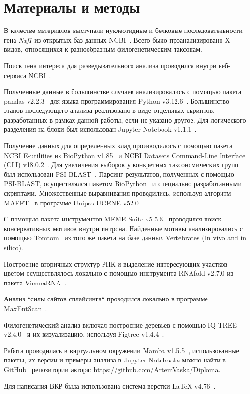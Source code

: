 \newpage
\section{Материалы и методы}

В качестве материалов выступали нуклеотидные и белковые последовательности гена \textit{Nxf1} из открытых баз данных NCBI~\cite{ncbi_general}.
Всего было проанализировано X видов, относящихся к разнообразным филогенетическим таксонам.

Поиск гена интереса для разведывательного анализа проводился внутри веб-сервиса NCBI~\cite{ncbi_general}.

Полученные данные в большинстве случаев анализировались с помощью пакета pandas v2.2.3~\cite{pandas} для языка программирования Python v3.12.6~\cite{python_3_12}.
Большинство этапов последующего анализа реализовано в виде отдельных скриптов, разработанных в рамках данной работы, если не указано другое.
Для логического разделения на блоки был использован Jupyter Notebook v1.1.1~\cite{jupyter_notebook}.

Получение данных для определенных клад производилось с помощью пакета NCBI E-utilities из BioPython v1.85~\cite{biopython} и NCBI Datasets Command-Line Interface (CLI) v18.0.2~\cite{datasets}.
Для увеличения выборок у конкретных таксономических групп был использован PSI-BLAST~\cite{psi_blast}.
Парсинг результатов, полученных с помощью PSI-BLAST, осуществлялся пакетом BioPython~\cite{biopython} и специально разработанными скриптами.
Множественные выравнивания проводились, используя алгоритм MAFFT~\cite{mafft} в программе Unipro UGENE v52.0~\cite{ugene}.

С помощью пакета инструментов MEME Suite v5.5.8~\cite{meme} проводился поиск консервативных мотивов внутри интрона.
Найденные мотивы анализировались с помощью Tomtom~\cite{tomtom} из того же пакета на базе данных Vertebrates (In vivo and in silico).

Построение вторичных структур РНК и выделение интересующих участков цветом осуществлялось локально с помощью инструмента RNAfold v2.7.0 из пакета ViennaRNA~\cite{viennarna}.

Анализ ``силы сайтов сплайсинга`` проводился локально в программе Max\-Ent\-Scan~\cite{maxentsccan}.

Филогенетический анализ включал построение деревьев с помощью IQ-TREE v2.4.0~\cite{iqtree2} и их визуализацию, используя Figtree v1.4.4~\cite{figtree}.

Работа проводилась в виртуальном окружении Mamba v1.5.5~\cite{mamba}, использованные пакеты, их версии и примеры анализа в Jupyter Notebooks можно найти в GitHub~\cite{github_general} репозитории автора: \url{https://github.com/ArtemVaska/Diploma}.

Для написания ВКР была использована система верстки LaTeX v4.76~\cite{latex}.
